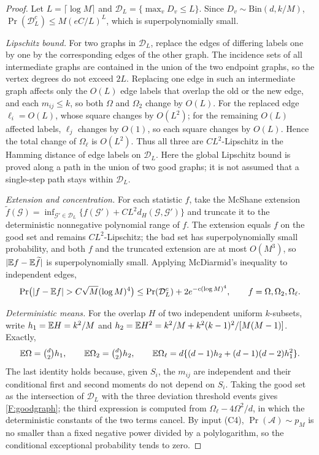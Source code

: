 \begin{proof}
Let $L=\lceil\log M\rceil$ and $\mathcal D_L=\{\max_vD_v\le L\}$. Since
$D_v\sim\mathrm{Bin}(d,k/M)$, $\Pr(\mathcal D_L^c)\le M(eC/L)^L$, which is superpolynomially
small.

\emph{Lipschitz bound.} For two graphs in $\mathcal D_L$, replace the edges of differing labels
one by one by the corresponding edges of the other graph. The incidence sets of all intermediate
graphs are contained in the union of the two endpoint graphs, so the vertex degrees do not exceed
$2L$. Replacing one edge in such an intermediate graph affects only the $O(L)$ edge labels that
overlap the old or the new edge, and each $m_{ij}\le k$, so both $\Omega$ and $\Omega_2$ change
by $O(L)$. For the replaced edge $\ell_i=O(L)$, whose square changes by $O(L^2)$; for the
remaining $O(L)$ affected labels, $\ell_j$ changes by $O(1)$, so each square changes by $O(L)$.
Hence the total change of $\Omega_\ell$ is $O(L^2)$. Thus all three are $CL^2$-Lipschitz in the
Hamming distance of edge labels on $\mathcal D_L$. Here the global Lipschitz bound is proved along
a path in the union of two good graphs; it is not assumed that a single-step path stays within
$\mathcal D_L$.

\emph{Extension and concentration.} For each statistic $f$, take the McShane extension
$\widetilde f(\mathcal G)=\inf_{\mathcal G'\in\mathcal D_L}\{f(\mathcal G')+CL^2d_H(\mathcal G,\mathcal G')\}$
and truncate it to the deterministic nonnegative polynomial range of $f$. The extension equals
$f$ on the good set and remains $CL^2$-Lipschitz; the bad set has superpolynomially small
probability, and both $f$ and the truncated extension are at most $O(M^3)$, so
$|\mathbb E f-\mathbb E\widetilde f|$ is superpolynomially small. Applying McDiarmid's inequality to independent
edges,
\[
\Pr\bigl(|f-\E f|>C\sqrt M(\log M)^4\bigr)\le\Pr(\mathcal D_L^c)+2e^{-c(\log M)^4},\qquad f=\Omega,\Omega_2,\Omega_\ell.
\]

\emph{Deterministic means.} For the overlap $H$ of two independent uniform $k$-subsets, write
$h_1=\mathbb E H=k^2/M$ and $h_2=\mathbb E H^2=k^2/M+k^2(k-1)^2/[M(M-1)]$. Exactly,
\[
\mathbb E\Omega=\tbinom d2h_1,\qquad\mathbb E\Omega_2=\tbinom d2h_2,\qquad\mathbb E\Omega_\ell=d\{(d-1)h_2+(d-1)(d-2)h_1^2\}.
\]
The last identity holds because, given $S_i$, the $m_{ij}$ are independent and their conditional
first and second moments do not depend on $S_i$. Taking the good set as the intersection of
$\mathcal D_L$ with the three deviation threshold events gives \eqref{F:goodgraph}; the third
expression is computed from $\Omega_\ell-4\Omega^2/d$, in which the deterministic constants of the
two terms cancel. By input (C4), $\Pr(\mathcal A)\sim p_M$ is no smaller than a fixed negative
power divided by a polylogarithm, so the conditional exceptional probability tends to zero.
\end{proof}

